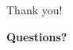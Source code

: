 \documentclass[dvips,slidetop,mathserif,red]{beamer}
\begin{document}

\begin{frame}{Thank you!}
  \vspace{5em}
  \begin{center}
    \begin{Huge}
      \textbf{Questions?}
    \end{Huge}
  \end{center}
  \vspace{5em}
\end{frame}
\end{document}
